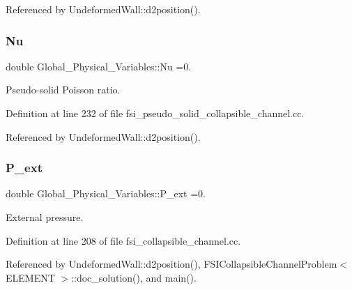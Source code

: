 Referenced by Undeformed\+Wall\+::d2position().

\mbox{\label{namespaceGlobal__Physical__Variables_a3962c36313826b19f216f6bbbdd6a477}} 
\subsubsection{\texorpdfstring{Nu}{Nu}}
{\footnotesize\ttfamily double Global\+\_\+\+Physical\+\_\+\+Variables\+::\+Nu =0.}



Pseudo-\/solid Poisson ratio. 



Definition at line 232 of file fsi\+\_\+pseudo\+\_\+solid\+\_\+collapsible\+\_\+channel.\+cc.



Referenced by Undeformed\+Wall\+::d2position().

\mbox{\label{namespaceGlobal__Physical__Variables_a0406c0cbd463d1df2458fe5de98a00eb}} 
\subsubsection{\texorpdfstring{P\+\_\+ext}{P\_ext}}
{\footnotesize\ttfamily double Global\+\_\+\+Physical\+\_\+\+Variables\+::\+P\+\_\+ext =0.}



External pressure. 



Definition at line 208 of file fsi\+\_\+collapsible\+\_\+channel.\+cc.



Referenced by Undeformed\+Wall\+::d2position(), F\+S\+I\+Collapsible\+Channel\+Problem$<$ E\+L\+E\+M\+E\+N\+T $>$\+::doc\+\_\+solution(), and main().

\mbox{\label{namespaceGlobal__Physical__Variables_ae1a493695b7f4619af32f405b0b28861}} 

